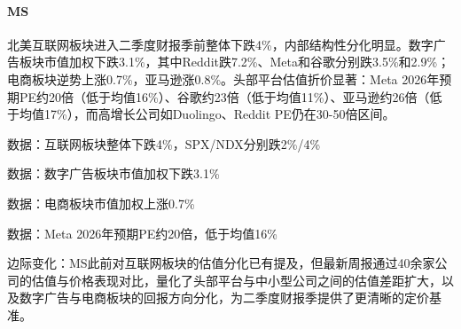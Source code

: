 \documentclass[11pt]{ctexart}
\begin{document}
\paragraph{MS} 北美互联网板块进入二季度财报季前整体下跌4\%，内部结构性分化明显。数字广告板块市值加权下跌3.1\%，其中Reddit跌7.2\%、Meta和谷歌分别跌3.5\%和2.9\%；电商板块逆势上涨0.7\%，亚马逊涨0.8\%。头部平台估值折价显著：Meta 2026年预期PE约20倍（低于均值16\%）、谷歌约23倍（低于均值11\%）、亚马逊约26倍（低于均值17\%），而高增长公司如Duolingo、Reddit PE仍在30-50倍区间。
{\small\color{refgray}数据：互联网板块整体下跌4\%，SPX/NDX分别跌2\%/4\%\par}
{\small\color{refgray}数据：数字广告板块市值加权下跌3.1\%\par}
{\small\color{refgray}数据：电商板块市值加权上涨0.7\%\par}
{\small\color{refgray}数据：Meta 2026年预期PE约20倍，低于均值16\%\par}
{\small\color{refgray}边际变化：MS此前对互联网板块的估值分化已有提及，但最新周报通过40余家公司的估值与价格表现对比，量化了头部平台与中小型公司之间的估值差距扩大，以及数字广告与电商板块的回报方向分化，为二季度财报季提供了更清晰的定价基准。\par}
\end{document}
